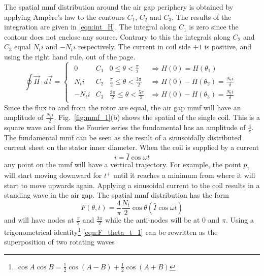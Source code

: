 The spatial mmf distribution around the air gap periphery is obtained by applying Amp\`ere's law to the contours $C_1$, $C_2$ and $C_3$. The results of the integration are given in \eqref{eqn:int_H}. The integral along $C_1$ is zero since the contour does not enclose any source. Contrary to this the integrals along $C_2$ and $C_3$ equal $N_ti$ and $-N_ti$ respectively. The current in coil side $+1$ is positive, and using the right hand rule, out of the page.  
\begin{equation}
 \label{eqn:int_H}
 \oint \vec{H} \cdot d\vec{l}=
 \begin{cases}
   \begin{array}{llll}
     0  & C_1 & 0 \leq \theta < \frac{\pi}{2} 
     & \Rightarrow H(0)=H(\theta_1)\\
     N_ti & C_2 & \frac{\pi}{2} \leq \theta < \frac{3\pi}{2} 
     & \Rightarrow H(0)-H(\theta_2) = \frac{N_ti}{\delta} \\
     -N_ti & C_3 & \frac{3\pi}{2} \leq \theta < \frac{5\pi}{3} 
     & \Rightarrow H(0)-H(\theta_3) = \frac{N_ti}{\delta}
   \end{array}
 \end{cases}
\end{equation}
Since the flux to and from the rotor are equal, the air gap mmf will have an amplitude of $\frac{N_ti}{2}$. Fig.~\ref{fig:mmf_1}(b) shows the spatial of the single coil. This is a square wave and from the Fourier series the fundamental has an amplitude of $\frac{4}{\pi}$. The fundamental mmf can be seen as the result of a sinusoidally distributed current sheet on the stator inner diameter. When the coil is supplied by a current 
\begin{equation}
  i = \hat{I}\cos\omega t
\end{equation}
any point on the mmf will have a vertical trajectory. For example, the point $p_1$ will start moving downward for $t^+$ until it reaches a minimum from where it will start to move upwards again. Applying a sinusoidal current to the coil results in a standing wave in the air gap. The spatial mmf distribution has the form
\begin{equation}
  \label{eqn:F_theta_t_1}
  F(\theta,t) = \frac{4}{\pi}\frac{N_t }{2}\cos\theta \left(\hat{I}\cos \omega t\right)
\end{equation}
and will have nodes at $\frac{\pi}{2}$ and $\frac{3\pi}{2}$ while the anti-nodes will be at $0$ and $\pi$. Using a trigonometrical identity\footnote{$\cos A \cos B = \frac{1}{2}\cos(A-B)+\frac{1}{2}\cos(A+B)$} \eqref{eqn:F_theta_t_1} can be rewritten as the superposition of two rotating waves
